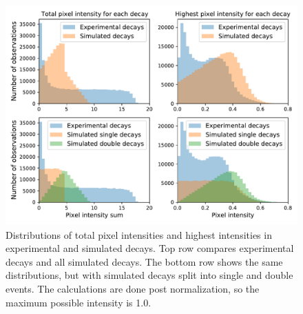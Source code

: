 \begin{figure}
\centering
\includegraphics[width=\textwidth]{chapters/results/figures/comparison_intensity.pdf}
\caption{\label{fig:comparison-intensity}Distributions of total pixel intensities and
highest intensities in experimental and simulated decays. Top row compares experimental 
decays and all simulated decays. The bottom row shows the same distributions, but with simulated
decays split into single and double events. The calculations are done post normalization, so
the maximum possible intensity is 1.0.}
\end{figure}